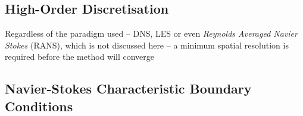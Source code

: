 \subsection{High-Order Discretisation} \label{sec:high-order}

Regardless of the paradigm used -- DNS, LES or even \emph{Reynolds Averaged Navier Stokes} (RANS), which is not discussed here -- a minimum spatial resolution is required before the method will converge






\subsection{Navier-Stokes Characteristic Boundary Conditions}

\cite{thompson1987TimeDependentBoundary, thompson1990TimeDependentBoundaryConditions, poinsot1992BoundaryConditionsDirect, poinsot2005TheoreticalNumericalCombustion, sutherland2003ImprovedBoundaryConditions}











